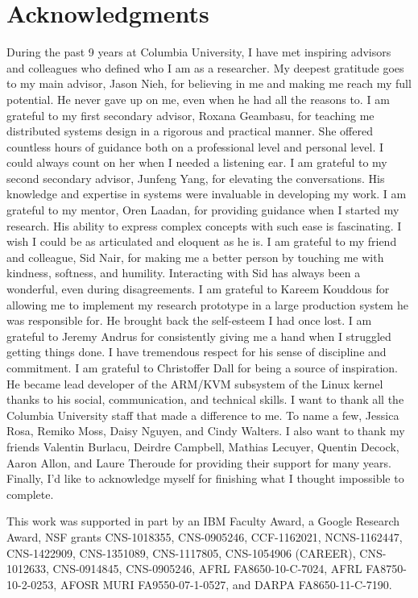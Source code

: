 \chapter*{Acknowledgments}
\label{ch:acks}

During the past 9 years at Columbia University, I have met inspiring advisors
and colleagues who defined who I am as a researcher. My deepest gratitude goes
to my main advisor, Jason Nieh, for believing in me and making me reach my full
potential. He never gave up on me, even when he had all the reasons to. I am
grateful to my first secondary advisor, Roxana Geambasu, for teaching me
distributed systems design in a rigorous and practical manner. She offered
countless hours of guidance both on a professional level and personal level. I
could always count on her when I needed a listening ear. I am grateful to my
second secondary advisor, Junfeng Yang, for elevating the conversations. His
knowledge and expertise in systems were invaluable in developing my work. I am
grateful to my mentor, Oren Laadan, for providing guidance when I started my
research. His ability to express complex concepts with such ease is fascinating.
I wish I could be as articulated and eloquent as he is. I am grateful to my
friend and colleague, Sid Nair, for making me a better person by touching me
with kindness, softness, and humility. Interacting with Sid has always been a
wonderful, even during disagreements. I am grateful to Kareem Kouddous for
allowing me to implement my research prototype in a large production system he
was responsible for. He brought back the self-esteem I had once lost. I am
grateful to Jeremy Andrus for consistently giving me a hand when I struggled
getting things done. I have tremendous respect for his sense of discipline and
commitment. I am grateful to Christoffer Dall for being a source of inspiration.
He became lead developer of the ARM/KVM subsystem of the Linux kernel thanks to
his social, communication, and technical skills. I want to thank all the
Columbia University staff that made a difference to me. To name a few, Jessica
Rosa, Remiko Moss, Daisy Nguyen, and Cindy Walters. I also want to thank my
friends Valentin Burlacu, Deirdre Campbell, Mathias Lecuyer, Quentin Decock,
Aaron Allon, and Laure Theroude for providing their support for many years.
Finally, I'd like to acknowledge myself for finishing what I thought impossible
to complete.

This work was supported in part by an IBM Faculty Award, a Google Research
Award, NSF grants CNS-1018355, CNS-0905246, CCF-1162021, NCNS-1162447,
CNS-1422909, CNS-1351089, CNS-1117805, CNS-1054906 (CAREER), CNS-1012633,
CNS-0914845, CNS-0905246, AFRL FA8650-10-C-7024, AFRL FA8750-10-2-0253, AFOSR MURI
FA9550-07-1-0527, and DARPA FA8650-11-C-7190.
